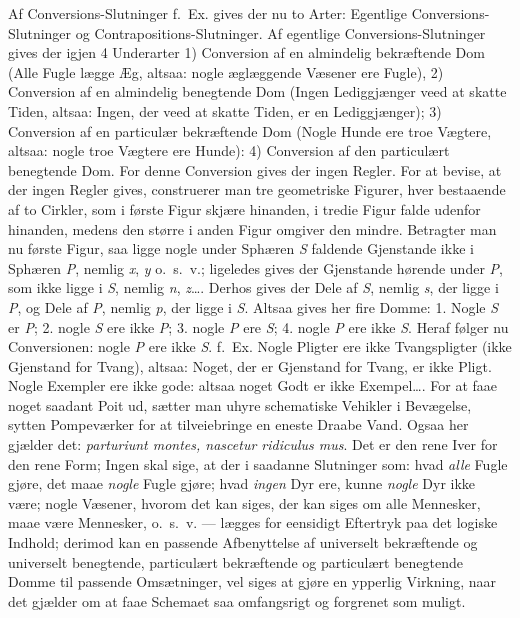 \documentclass[12pt]{book}
\newcommand{\opage}[1]{\marginnote{\footnotesize\textit{[#1]}}}
\begin{document}
{Af Conversions-Slutninger f.~Ex. gives der nu to Arter:
Egentlige Conversions-Slutninger og Contrapositions-Slutninger.
Af egentlige Conversions-Slutninger gives der igjen 4 Underarter
1) Conversion af en almindelig bekræftende Dom (Alle Fugle
lægge Æg, altsaa: nogle æglæggende Væsener ere Fugle), 2) Conversion
af en almindelig benegtende Dom (Ingen Lediggjænger
veed at skatte Tiden, altsaa: Ingen, der veed at skatte Tiden, er en
Lediggjænger); 3) Conversion af en particulær bekræftende Dom
(Nogle Hunde ere troe Vægtere, altsaa: nogle troe Vægtere ere
Hunde): 4) Conversion af den particulært benegtende Dom. For
denne Conversion gives der ingen Regler. For at bevise, at der
ingen Regler gives, construerer man tre geometriske Figurer, hver
bestaaende af to Cirkler, som i første Figur skjære hinanden, i
tredie Figur falde udenfor hinanden, medens den større i anden
Figur omgiver den mindre. Betragter man nu første Figur, saa
ligge nogle under Sphæren \textit{S} faldende Gjenstande ikke i Sphæren
\textit{P}, nemlig \textit{x}, \textit{y} o.~s.~v.; ligeledes gives der Gjenstande hørende
under \textit{P}, som ikke ligge i \textit{S}, nemlig \textit{n}, \textit{z}\dots. Derhos gives der
Dele af \textit{S}, nemlig \textit{s}, der ligge i \textit{P}, og Dele af \textit{P}, nemlig \textit{p}, der
ligge i \textit{S}. Altsaa gives her fire Domme: 1. Nogle \textit{S} er \textit{P}; 2.
nogle \textit{S} ere ikke \textit{P}; 3. nogle \textit{P} ere \textit{S}; 4. nogle \textit{P} ere ikke \textit{S}.
Heraf følger nu Conversionen: nogle \textit{P} ere ikke \textit{S}. f.~Ex. Nogle
Pligter ere ikke Tvangspligter (ikke Gjenstand for Tvang), altsaa:
Noget, der er Gjenstand for Tvang, er ikke Pligt. Nogle Exempler
ere ikke gode: altsaa noget Godt er ikke Exempel\dots. For
at faae noget saadant Poit ud, sætter man uhyre schematiske Vehikler
i Bevægelse, sytten Pompeværker for at tilveiebringe en eneste
Draabe Vand. Ogsaa her gjælder det: \textit{parturiunt montes, nascetur
ridiculus mus}.}%
Det er den
\opage{300}rene Iver for den rene Form; Ingen skal sige, at der i saadanne
Slutninger som: hvad \emph{alle} Fugle gjøre, det maae
\opage{301}\emph{nogle} Fugle gjøre; hvad \emph{ingen} Dyr ere, kunne \emph{nogle} Dyr ikke være; nogle Væsener, hvorom det kan siges, der kan siges om alle Mennesker, maae være Mennesker, o.\ s.\ v. --- lægges for eensidigt Eftertryk paa det logiske Indhold; derimod kan en passende Afbenyttelse af universelt bekræftende og universelt benegtende, particulært bekræftende og particulært benegtende Domme til passende Omsætninger, vel siges at gjøre en ypperlig Virkning, naar det gjælder om at faae Schemaet saa omfangsrigt og forgrenet som muligt.
\end{document}
